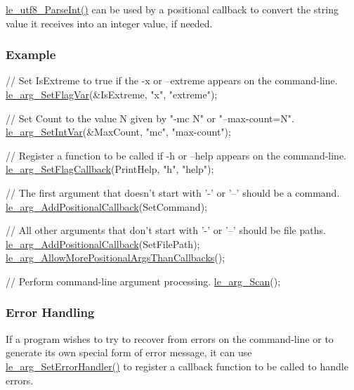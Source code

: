 \hyperlink{le__utf8_8h_a680a92fafea1ed72dedb80b52be32a06}{le\+\_\+utf8\+\_\+\+Parse\+Int()} can be used by a positional callback to convert the string value it receives into an integer value, if needed.\hypertarget{c_args_c_args_parser_example}{}\subsubsection{Example}\label{c_args_c_args_parser_example}

\begin{DoxyCode}
\textcolor{comment}{// Set IsExtreme to true if the -x or --extreme appears on the command-line.}
\hyperlink{le__args_8h_a889bb72c62d8590d61170a069219e852}{le\_arg\_SetFlagVar}(&IsExtreme, \textcolor{stringliteral}{"x"}, \textcolor{stringliteral}{"extreme"});

\textcolor{comment}{// Set Count to the value N given by "-mc N" or "--max-count=N".}
\hyperlink{le__args_8h_a27f1486b1e855559158e218a7d93ce73}{le\_arg\_SetIntVar}(&MaxCount, \textcolor{stringliteral}{"mc"}, \textcolor{stringliteral}{"max-count"});

\textcolor{comment}{// Register a function to be called if -h or --help appears on the command-line.}
\hyperlink{le__args_8h_a4594892b35d4e0a6d7551e9c371919fc}{le\_arg\_SetFlagCallback}(PrintHelp, \textcolor{stringliteral}{"h"}, \textcolor{stringliteral}{"help"});

\textcolor{comment}{// The first argument that doesn't start with '-' or '--' should be a command.}
\hyperlink{le__args_8h_a525bef6095a4655e97008e27a4829d44}{le\_arg\_AddPositionalCallback}(SetCommand);

\textcolor{comment}{// All other arguments that don't start with '-' or '--' should be file paths.}
\hyperlink{le__args_8h_a525bef6095a4655e97008e27a4829d44}{le\_arg\_AddPositionalCallback}(SetFilePath);
\hyperlink{le__args_8h_ab646cfcb831e13312bff496221e74acc}{le\_arg\_AllowMorePositionalArgsThanCallbacks}();

\textcolor{comment}{// Perform command-line argument processing.}
\hyperlink{le__args_8h_af44485fc914a7ac6f562d23d66c3410c}{le\_arg\_Scan}();
\end{DoxyCode}
\hypertarget{c_args_c_args_parser_errorHandling}{}\subsubsection{Error Handling}\label{c_args_c_args_parser_errorHandling}
If a program wishes to try to recover from errors on the command-\/line or to generate its own special form of error message, it can use \hyperlink{le__args_8h_a5128be1cbe2c7b30f1f697f8b5594479}{le\+\_\+arg\+\_\+\+Set\+Error\+Handler()} to register a callback function to be called to handle errors.

